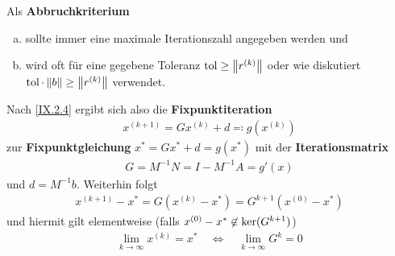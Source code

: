 Als \textbf{Abbruchkriterium}
\begin{enumerate}[a)]
\item sollte immer eine maximale Iterationszahl angegeben werden und
\item wird oft für eine gegebene Toleranz $\Tol\geq\nn[r^{(k)}]$
  oder wie diskutiert $\Tol \cdot \nn[b]\geq \nn[r^{(k)}]$ verwendet.
\end{enumerate}

Nach \eqref{IX.2.4} ergibt sich also die \textbf{Fixpunktiteration}
\begin{gather}
  x^{(k+1)} = Gx^{(k)} +d \eqqcolon g(x^{(k)})
  \label{IX.2.6}
\end{gather}
zur \textbf{Fixpunktgleichung}
$x^{*} = Gx^{*} + d = g(x^{*})$
mit der \textbf{Iterationsmatrix} 
\begin{gather}
  G=M^{-1}N=I-M^{-1}A = g'(x)
  \label{IX.2.7}
\end{gather}
und $d=M^{-1}b$. Weiterhin folgt
\begin{gather*}
  x^{(k+1)}-x^{*} = G(x^{(k)}-x^{*})=G^{k+1}(x^{(0)}-x^{*})
\end{gather*}
und hiermit gilt elementweise (falls $x^{(0)}-x^{*}\not\in \Ker
(G^{k+1})$)
\begin{gather*}
  \lim_{k\to\infty} x^{(k)} = x^{*}
  \quad\Leftrightarrow\quad
  \lim_{k\to\infty} G^k =0
\end{gather*}


